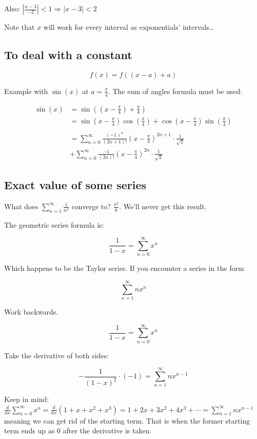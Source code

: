 \documentclass[12pt]{article}
\theoremstyle{plain}
\theoremstyle{remark}
\theoremstyle{definition}
\begin{document}
Also: \(\left| \frac{x - 3}{- 2} \right| < 1 \Rightarrow |x - 3| < 2\)

Note that \(x\) will work for every interval as exponentials'
intervals\ldots{}


\subsection{To deal with a constant}

\[f(x) = f\left( (x - a) + a \right)\]

Example with \(\sin(x)\) at \(a = \frac{\pi}{4}\). The sum of angles
formula must be used:

\begin{align*}
\sin(x) &= \sin\left( \left( x - \frac{\pi}{4} \right) + \frac{\pi}{4} \right) \\
&= \sin\left( x - \frac{\pi}{4} \right)\cos\left( \frac{\pi}{4} \right) + \cos\left( x - \frac{\pi}{4} \right)\sin\left( \frac{\pi}{4} \right) \\
& \\
&= \sum_{n = 0}^{\infty}{\frac{( - 1)^{n}}{(2n + 1)!}\left( x - \frac{\pi}{4} \right)^{2n + 1} \cdot \frac{1}{\sqrt{2}}}  \\
&+ \sum_{n = 0}^{\infty}{\frac{- 1}{(2n)!}\left( x - \frac{\pi}{4} \right)^{2n}} \cdot \frac{1}{\sqrt{2}}
\end{align*}



\subsection{Exact value of some
series}

What does \(\sum_{n = 1}^{\infty}\frac{1}{n^{2}}\) converge to?
\(\frac{\pi^{2}}{6}\). We'll never get this result.

The geometric series formula is:

\[\frac{1}{1 - x} = \sum_{n = 0}^{\infty}x^{n}\]

Which happens to be the Taylor series. If you encounter a series in the
form

\[\sum_{n = 1}^{\infty}{nx^{n}}\]

Work backwards.

\[\frac{1}{1 - x} = \sum_{n = 0}^{\infty}x^{n}\]

Take the derivative of both sides:

\[- \frac{1}{(1 - x)^{2}} \cdot ( - 1) = \sum_{n = 1}^{\infty}{nx^{n - 1}}\]

Keep in mind:
\(\frac{d}{\text{d}x}\sum_{n = 0}^{\infty}x^{n} = \frac{d}{\text{d}x}\left( 1 + x + x^{2} + x^{3} \right) = 1 + 2x + 3x^{2} + 4x^{3} + \cdots = \sum_{n = 1}^{\infty}{nx^{n - 1}}\)
meaning we can get rid of the starting term. That is when the former
starting term ends up as 0 after the derivative is taken.
\end{document}
